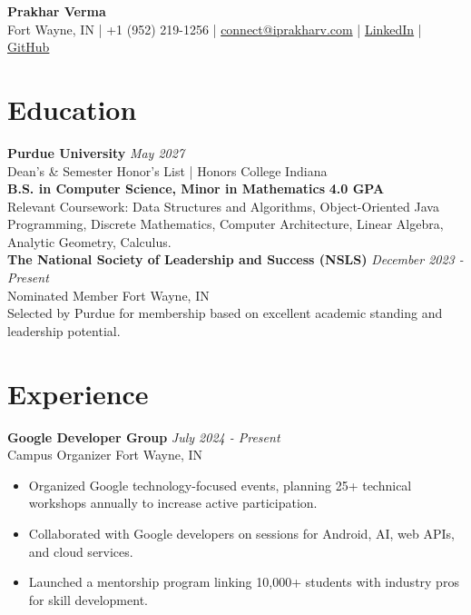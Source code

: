 \documentclass[a4paper,10pt]{article}
\begin{document}
\begin{center}
    \textbf{\Huge Prakhar Verma} \\
    \vspace{0.2cm}
    Fort Wayne, IN | +1 (952) 219-1256 | \href{mailto:connect@iprakharv.com}{connect@iprakharv.com} | \href{https://www.linkedin.com/in/iprakharv}{LinkedIn} | \href{https://www.github.com/iPrakharV}{GitHub} \\
\end{center}

\section*{Education}
\textbf{Purdue University} \hfill \textit{May 2027} \\
Dean's \& Semester Honor's List | Honors College \hfill Indiana \\
\textbf{B.S. in Computer Science, Minor in Mathematics} \hfill \textbf{4.0 GPA} \\
Relevant Coursework: Data Structures and Algorithms, Object-Oriented Java Programming, Discrete Mathematics, Computer Architecture, Linear Algebra, Analytic Geometry, Calculus. \\

\textbf{The National Society of Leadership and Success (NSLS)} \hfill \textit{December 2023 - Present} \\
Nominated Member \hfill Fort Wayne, IN \\
Selected by Purdue for membership based on excellent academic standing and leadership potential. \\

\section*{Experience}
\textbf{Google Developer Group} \hfill \textit{July 2024 - Present} \\
Campus Organizer \hfill Fort Wayne, IN \\
\begin{itemize}[leftmargin=*]
    \item Organized Google technology-focused events, planning 25+ technical workshops annually to increase active participation.
    \item Collaborated with Google developers on sessions for Android, AI, web APIs, and cloud services.
    \item Launched a mentorship program linking 10,000+ students with industry pros for skill development.
\end{itemize}
\end{document}
